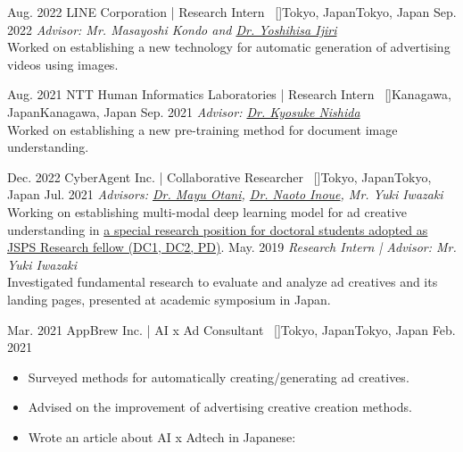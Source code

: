 
\begin{experiences}
    \researchexperience
    {Aug. 2022}   {LINE Corporation | Research Intern{\normalfont  ~ [\href{https://linecorp.com/en/}{\small{\websiteSymbol}}]}}{Tokyo, Japan}{Tokyo, Japan}
    {Sep. 2022} {\textit{Advisor: Mr. Masayoshi Kondo and \href{https://scholar.google.co.jp/citations?user=VVoeVYIAAAAJ}{Dr. Yoshihisa Ijiri}}\\
    Worked on establishing a new technology for automatic generation of advertising videos using images.
    }

    \emptySeparator
    \researchexperience
    {Aug. 2021}   {NTT Human Informatics Laboratories | Research Intern{\normalfont  ~ [\href{https://www.rd.ntt/e/hil/}{\small{\websiteSymbol}}]}}{Kanagawa, Japan}{Kanagawa, Japan}
    {Sep. 2021} {\textit{Advisor: \href{https://www.knishida.info/}{Dr. Kyosuke Nishida}}\\
    Worked on establishing a new pre-training method for document image understanding.
    }

    \emptySeparator
    \researchexperience
    {Dec. 2022}   {CyberAgent Inc. | Collaborative Researcher{\normalfont  ~ [\href{https://www.cyberagent.co.jp/news/detail/id=26231}{\small{\websiteSymbol}}]}}{Tokyo, Japan}{Tokyo, Japan}
    {Jul. 2021} {\textit{Advisors: \href{https://mayu-ot.github.io/}{Dr. Mayu Otani}, \href{https://naoto0804.github.io/}{Dr. Naoto Inoue}, {Mr. Yuki Iwazaki}}\\
    Working on establishing multi-modal deep learning model for ad creative understanding in \href{https://www.cyberagent.co.jp/news/detail/id=26231}{a special research position for doctoral students adopted as JSPS Research fellow (DC1, DC2, PD)}.
    \vskip 0.1cm
    }
    \researchexperience
    {}   {}{}{}
    {May. 2019} {\textit{Research Intern | Advisor: {Mr. Yuki Iwazaki}}\\
    Investigated fundamental research to evaluate and analyze ad creatives and its landing pages, presented at academic symposium in Japan.
    }

    \emptySeparator
    \researchexperience
    {Mar. 2021}   {AppBrew Inc. | AI x Ad Consultant{\normalfont  ~ [\href{https://appbrew.io/}{\small{\websiteSymbol}}]}}{Tokyo, Japan}{Tokyo, Japan}
    {Feb. 2021} {
    \begin{itemize}
        \item Surveyed methods for automatically creating/generating ad creatives.
        \item Advised on the improvement of advertising creative creation methods.
        \item Wrote an article about AI x Adtech in Japanese:
    \end{itemize}
    }


\end{experiences}
